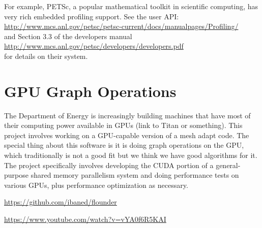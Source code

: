 \documentclass[12pt]{article}
\begin{document}
For example, PETSc, a popular mathematical toolkit in scientific computing, has
very rich embedded profiling support. See the user API: \\
\url{http://www.mcs.anl.gov/petsc/petsc-current/docs/manualpages/Profiling/} \\
and Section 3.3 of the developers manual \\
\url{http://www.mcs.anl.gov/petsc/developers/developers.pdf} \\
for details on their system.

\section{GPU Graph Operations}
The Department of Energy is increasingly building machines that have most of
their computing power available in GPUs (link to Titan or something). This
project involves working on a GPU-capable version of a mesh adapt
code. The special thing about this software is it is doing graph operations on
the GPU, which traditionally is not a good fit but we think we have good
algorithms for it. The project specifically involves developing the CUDA
portion of a general-purpose shared memory parallelism system and doing
performance tests on various GPUs, plus performance optimization as necessary.

\url{https://github.com/ibaned/flounder}

\url{https://www.youtube.com/watch?v=vYA0f6R5KAI}
\end{document}
